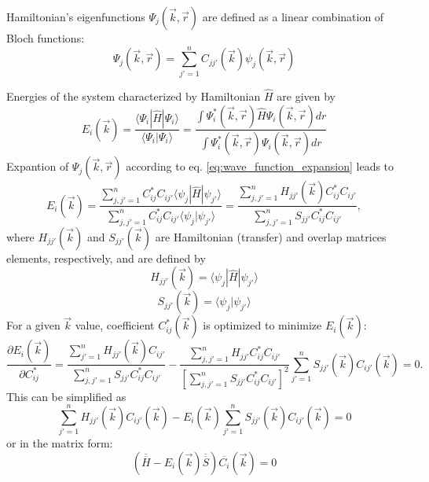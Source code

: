 Hamiltonian's eigenfunctions $\Psi_j(\vec{k}, \vec{r})$ are defined as a linear combination of Bloch functions:
\begin{equation} \label{eq:wave_function_expansion}
	\Psi_j(\vec{k}, \vec{r}) = \sum_{j'=1}^{n} C_{jj'}(\vec{k}) \psi_j(\vec{k}, \vec{r})
\end{equation}

Energies of the system characterized by Hamiltonian $\hat{H}$ are given by
\begin{equation}
	E_i(\vec{k}) = \frac{\langle \Psi_i | \hat{H} | \Psi_i \rangle}{\langle \Psi_i | \Psi_i \rangle} = \frac{\int \Psi^*_i(\vec{k}, \vec{r}) \hat{H} \Psi_i(\vec{k}, \vec{r}) dr}{\int \Psi^*_i(\vec{k}, \vec{r}) \Psi_i(\vec{k}, \vec{r}) dr}
\end{equation}
Expantion of $\Psi_j(\vec{k}, \vec{r})$ according to eq. \ref{eq:wave_function_expansion} leads to
\begin{equation}
	E_i(\vec{k}) = \frac{\sum\limits_{j,j'=1}^{n} C^*_{ij} C_{ij'} \langle \psi_j | \hat{H} | \psi_{j'} \rangle}{\sum\limits_{j,j'=1}^{n} C^*_{ij} C_{ij'} \langle \psi_j | \psi_{j'} \rangle} = \frac{\sum\limits_{j,j'=1}^{n} H_{jj'}(\vec{k}) C^*_{ij} C_{ij'}}{\sum\limits_{j,j'=1}^{n} S_{jj'} C^*_{ij} C_{ij'}},
\end{equation} 
where $H_{jj'}(\vec{k})$ and $S_{jj'}(\vec{k})$ are Hamiltonian (transfer) and overlap matrices elements, respectively, and are defined by
\begin{equation} \label{eq:h_matrix}
	H_{jj'}(\vec{k}) = \langle \psi_j | \hat{H} | \psi_{j'} \rangle
\end{equation}
\begin{equation} \label{eq:s_matrix}
	S_{jj'}(\vec{k}) = \langle \psi_j | \psi_{j'} \rangle
\end{equation}
For a given $\vec{k}$ value, coefficient $C^*_{ij}(\vec{k})$ is optimized to minimize $E_i(\vec{k})$:
\begin{equation}
	\frac{\partial E_i (\vec{k})}{\partial C^*_{ij}} = \frac{\sum\limits_{j'=1}^{n} H_{jj'}(\vec{k}) C_{ij'}}{\sum\limits_{j,j'=1}^{n} S_{jj'} C^*_{ij} C_{ij'}} - \frac{\sum\limits_{j,j'=1}^{n} H_{jj'} C^*_{ij} C_{ij'}}{[\sum\limits_{j,j'=1}^{n} S_{jj'} C^*_{ij} C_{ij'}]^2} \sum\limits_{j'=1}^{n} S_{jj'}(\vec{k}) C_{ij'}(\vec{k}) = 0.
\end{equation}
This can be simplified as 
\begin{equation}
	\sum_{j'=1}^{n} H_{jj'}(\vec{k}) C_{ij'}(\vec{k}) - E_i(\vec{k}) \sum_{j'=1}^{n} S_{jj'}(\vec{k}) C_{ij'}(\vec{k}) = 0
\end{equation}
or in the matrix form:
\begin{equation} \label{eq:secular}
	(\overline{\overline{H}} - E_i(\vec{k})\overline{\overline{S}})\overline{C_i}(\vec{k}) = 0
\end{equation}

